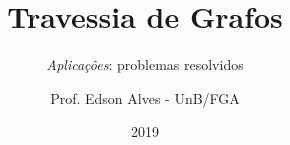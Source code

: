 \title{Travessia de Grafos}
\subtitle{\textit{Aplicações}: problemas resolvidos}
\author{Prof. Edson Alves - UnB/FGA}
\date{2019}
